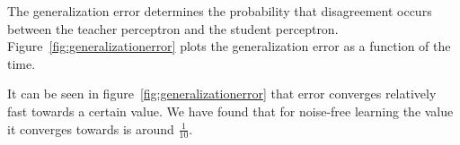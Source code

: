 The generalization error determines the probability that disagreement occurs between the teacher perceptron and the student perceptron. Figure~\ref{fig:generalizationerror} plots the generalization error as a function of the time.

It can be seen in figure~\ref{fig:generalizationerror} that error converges relatively fast towards a certain value. We have found that for noise-free learning the value it converges towards is around  $\frac{1}{10}$.

